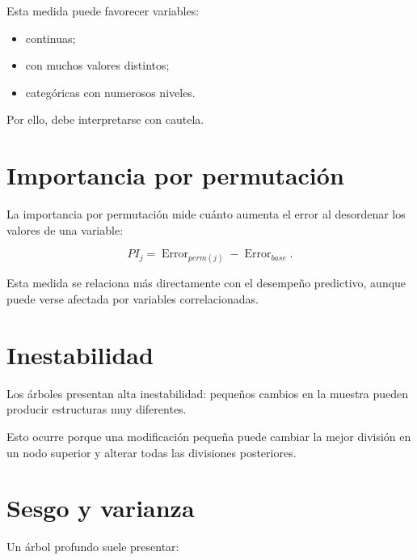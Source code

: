 \documentclass[
  spanish,
  10.5pt,
  letterpaper,
  DIV=11,
  numbers=noendperiod,
  oneside,
  open=any]{scrreprt}
\providecommand{\tightlist}{%
  \setlength{\itemsep}{0pt}\setlength{\parskip}{0pt}}
\theoremstyle{definition}
\theoremstyle{definition}
\theoremstyle{plain}
\theoremstyle{remark}
\begin{document}

Esta medida puede favorecer variables:

\begin{itemize}
\tightlist
\item
  continuas;
\item
  con muchos valores distintos;
\item
  categóricas con numerosos niveles.
\end{itemize}

Por ello, debe interpretarse con cautela.

\section*{Importancia por
permutación}\label{importancia-por-permutaciuxf3n}


La importancia por permutación mide cuánto aumenta el error al
desordenar los valores de una variable:

\[
PI_j
=
\operatorname{Error}_{perm(j)}
-
\operatorname{Error}_{base}.
\]

Esta medida se relaciona más directamente con el desempeño predictivo,
aunque puede verse afectada por variables correlacionadas.

\section*{Inestabilidad}\label{inestabilidad}


Los árboles presentan alta inestabilidad: pequeños cambios en la muestra
pueden producir estructuras muy diferentes.

Esto ocurre porque una modificación pequeña puede cambiar la mejor
división en un nodo superior y alterar todas las divisiones posteriores.

\section*{Sesgo y varianza}\label{sesgo-y-varianza-2}


Un árbol profundo suele presentar:
\end{document}
